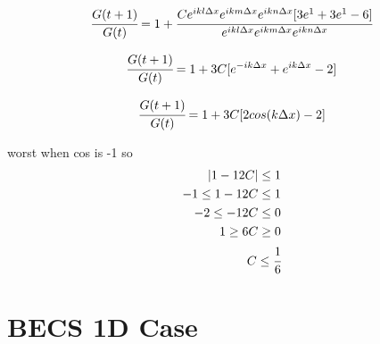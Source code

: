 \documentclass[1pt]{article}
\begin{document}
    \begin{equation*}
    \cfrac{G(t+1)}{G(t)} = 1 + \cfrac{Ce^{ikl\Delta x}e^{ikm\Delta x}e^{ikn\Delta x}[3e^{1}+3e^{1}-6]  }{e^{ikl\Delta x}e^{ikm\Delta x}e^{ikn\Delta x} } 
    \end{equation*}








    
    \begin{equation*}
    \cfrac{G(t+1)}{G(t)} = 1 + 3C[ e^{-ik\Delta x}+e^{ik\Delta x}-2 ] 
    \end{equation*}












    \begin{equation*}
    \cfrac{G(t+1)}{G(t)} = 1 + 3C[ 2cos(k\Delta x)-2 ]
    \end{equation*}




    worst when cos is -1 so \\
    
    \begin{eqnarray*}
    |1-12C|\leq 1     \\
    -1 \leq 1-12C \leq 1 \\
    -2 \leq -12C \leq 0 \\
    1 \geq 6C \geq 0   \\
    C \leq \cfrac{1}{6}    \\
    \end{eqnarray*}
    
   








 \newpage
 
  \section{BECS 1D Case}
\end{document}
